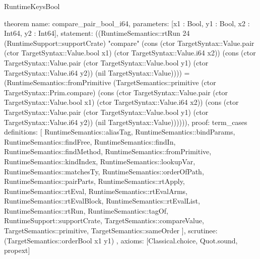 \begin{lexlean}{RuntimeKeysBool}
\begin{semanticmodule}
theorem{
  name: compare_pair_bool_i64,
  parameters: [x1 : Bool, y1 : Bool, x2 : Int64, y2 : Int64],
  statement: ((RuntimeSemantics::rtRun 24 (RuntimeSupport::supportCrate) "compare" (cons (ctor TargetSyntax::Value.pair (ctor TargetSyntax::Value.bool x1) (ctor TargetSyntax::Value.i64 x2)) (cons (ctor TargetSyntax::Value.pair (ctor TargetSyntax::Value.bool y1) (ctor TargetSyntax::Value.i64 y2)) (nil TargetSyntax::Value)))) = (RuntimeSemantics::fromPrimitive (TargetSemantics::primitive (ctor TargetSyntax::Prim.compare) (cons (ctor TargetSyntax::Value.pair (ctor TargetSyntax::Value.bool x1) (ctor TargetSyntax::Value.i64 x2)) (cons (ctor TargetSyntax::Value.pair (ctor TargetSyntax::Value.bool y1) (ctor TargetSyntax::Value.i64 y2)) (nil TargetSyntax::Value)))))),
  proof: term_cases{
    definitions: [
      RuntimeSemantics::aliasTag,
      RuntimeSemantics::bindParams,
      RuntimeSemantics::findFree,
      RuntimeSemantics::findIn,
      RuntimeSemantics::findMethod,
      RuntimeSemantics::fromPrimitive,
      RuntimeSemantics::kindIndex,
      RuntimeSemantics::lookupVar,
      RuntimeSemantics::matchesTy,
      RuntimeSemantics::orderOfPath,
      RuntimeSemantics::pairParts,
      RuntimeSemantics::rtApply,
      RuntimeSemantics::rtEval,
      RuntimeSemantics::rtEvalArms,
      RuntimeSemantics::rtEvalBlock,
      RuntimeSemantics::rtEvalList,
      RuntimeSemantics::rtRun,
      RuntimeSemantics::tagOf,
      RuntimeSupport::supportCrate,
      TargetSemantics::compareValue,
      TargetSemantics::primitive,
      TargetSemantics::sameOrder
    ],
    scrutinee: (TargetSemantics::orderBool x1 y1)
  },
  axioms: [Classical.choice, Quot.sound, propext]
}
\end{semanticmodule}
\end{lexlean}
